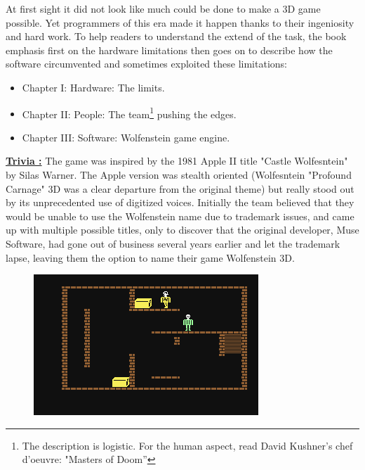 At first sight it did not look like much could be done to make a 3D game possible. Yet programmers of this era made it happen thanks to their ingeniosity and hard work. To help readers to understand the extend of the task, the book emphasis first on the hardware limitations then goes on to describe how the software circumvented and sometimes exploited these limitations:
\begin{itemize}
\item Chapter I: Hardware: The limits.
\item Chapter II: People: The team\footnote{The description is logistic. For the human aspect, read David Kushner's chef d'oeuvre: "Masters of Doom''} pushing the edges.
\item Chapter III: Software: Wolfenstein game engine.
\end{itemize}
\par
\textbf{\underline{Trivia :}} The game was inspired by the 1981 Apple II title "Castle Wolfesntein" by Silas Warner. The Apple version was stealth oriented (Wolfesntein "Profound Carnage" 3D was a clear departure from the original theme) but really stood out by its unprecedented use of digitized voices. Initially the team believed that they would be unable to use the Wolfenstein name due to trademark issues, and came up with multiple possible titles, only to discover that the original developer, Muse Software, had gone out of business several years earlier and let the trademark lapse, leaving them the option to name their game Wolfenstein 3D.

 \begin{figure}[H]
\centering
      \includegraphics[width=\textwidth]{imgs/CastleWolfensteinC64.png}
\end{figure}


